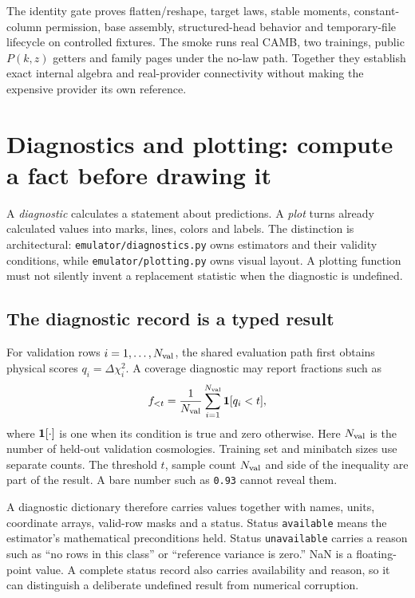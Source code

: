 \documentclass[10pt,aps,prd,twocolumn,nofootinbib]{revtex4-2}
\newcommand{\code}[1]{\texttt{#1}}
\begin{document}
The identity gate proves flatten/reshape, target laws, stable moments,
constant-column permission, base assembly, structured-head behavior and
temporary-file lifecycle on controlled fixtures.  The smoke runs real CAMB,
two trainings, public \(P(k,z)\) getters and family pages under the no-law
path.  Together they establish exact internal algebra and real-provider
connectivity without making the expensive provider its own reference.

\section{Diagnostics and plotting: compute a fact before drawing it}
\label{chap:diagnostics}

A \emph{diagnostic} calculates a statement about predictions.  A \emph{plot}
turns already calculated values into marks, lines, colors and labels.  The
distinction is architectural: \code{emulator/diagnostics.py} owns estimators
and their validity conditions, while \code{emulator/plotting.py} owns visual
layout.  A plotting function must not silently invent a replacement statistic
when the diagnostic is undefined.

\subsection{The diagnostic record is a typed result}

For validation rows \(i=1,\ldots,N_{\rm val}\), the shared evaluation path first obtains
physical scores \(q_i=\Delta\chi_i^2\).  A coverage diagnostic may report
fractions such as
\begin{equation*}
 f_{<t}=\frac{1}{N_{\rm val}}
         \sum_{i=1}^{N_{\rm val}}{\bf 1}[q_i<t],
\end{equation*}
where \({\bf 1}[\cdot]\) is one when its condition is true and zero otherwise.
Here $N_{\rm val}$ is the number of held-out validation cosmologies.  Training
set and minibatch sizes use separate counts.  The threshold \(t\), sample count
\(N_{\rm val}\) and side of the inequality are part
of the result.  A bare number such as \code{0.93} cannot reveal them.

A diagnostic dictionary therefore carries values together with names, units,
coordinate arrays, valid-row masks and a status.  Status \code{available}
means the estimator's mathematical preconditions held.  Status
\code{unavailable} carries a reason such as ``no rows in this class'' or
``reference variance is zero.''  NaN is a floating-point value.  A complete
status record also carries availability and reason, so it can distinguish a deliberate undefined result from
numerical corruption.
\end{document}

